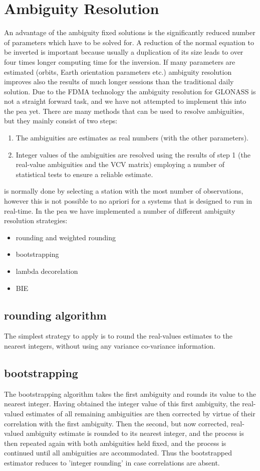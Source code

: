 \chapter{Ambiguity Resolution}
\label{ch:Ambiguity Resolution}
An advantage of the ambiguity fixed solutions is the significantly reduced number of parameters which have to be solved for. 
A reduction of the normal equation to be inverted is important because usually a duplication of its size leads to over four times longer computing time for the inversion. 
If many parameters are estimated (orbits, Earth orientation parameters etc.) ambiguity resolution improves also the results of much longer sessions than the traditional daily solution.  
Due to the FDMA technology the ambiguity resolution for GLONASS is not a straight forward task, and we have not attempted to implement this into the pea yet.
%
There are many methods that can be used to resolve ambiguities, but they mainly consist of two steps:
%
\begin{enumerate}
    \item The ambiguities are estimates as real numbers (with the other parameters).
    \item Integer values of the ambiguities are resolved using the results of step 1 (the real-value ambiguities and the VCV matrix) employing a number of statistical tests to ensure a reliable estimate.
\end{enumerate}
%
 is normally done by selecting a station with the most number of observations, however this is not possible to no apriori for a systems that is designed to run in real-time.
%
In the pea we have implemented a number of different ambiguity resolution strategies:
\begin{itemize}
    \item rounding and weighted rounding
    \item bootstrapping
    \item lambda decorelation
    \item BIE
\end{itemize}
%
\section{rounding algorithm}
The simplest strategy to apply is to round the real-values estimates to the nearest integers, without using any variance co-variance information.
%
\section{bootstrapping}
%
The bootstrapping algorithm takes the first ambiguity and rounds its value to the nearest integer. Having obtained the integer value of this first ambiguity, the real-valued estimates of all remaining ambiguities are then corrected by virtue of their correlation with the first ambiguity. 
Then the second, but now corrected, real-valued ambiguity estimate is rounded to its nearest integer, and the process is then repeated again with both ambiguities held fixed, and the process is continued until all ambiguities are accommodated. 
Thus the bootstrapped estimator reduces to ’integer rounding’ in case correlations are absent.
%
